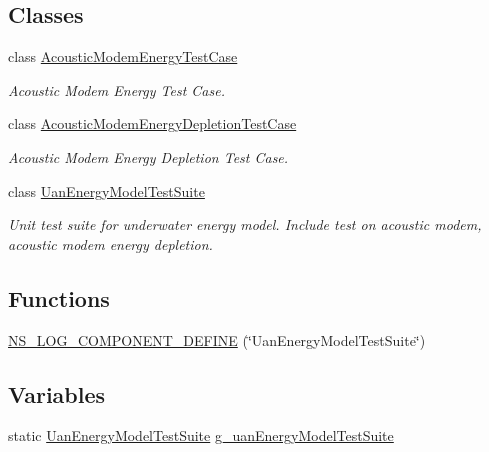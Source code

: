 \subsection*{Classes}
\begin{DoxyCompactItemize}
\item 
class \hyperlink{classAcousticModemEnergyTestCase}{Acoustic\+Modem\+Energy\+Test\+Case}
\begin{DoxyCompactList}\small\item\em Acoustic Modem Energy Test Case. \end{DoxyCompactList}\item 
class \hyperlink{classAcousticModemEnergyDepletionTestCase}{Acoustic\+Modem\+Energy\+Depletion\+Test\+Case}
\begin{DoxyCompactList}\small\item\em Acoustic Modem Energy Depletion Test Case. \end{DoxyCompactList}\item 
class \hyperlink{classUanEnergyModelTestSuite}{Uan\+Energy\+Model\+Test\+Suite}
\begin{DoxyCompactList}\small\item\em Unit test suite for underwater energy model. Include test on acoustic modem, acoustic modem energy depletion. \end{DoxyCompactList}\end{DoxyCompactItemize}
\subsection*{Functions}
\begin{DoxyCompactItemize}
\item 
\hyperlink{uan-energy-model-test_8cc_afe6a570fe57ecf9f8c51a0417893abfc}{N\+S\+\_\+\+L\+O\+G\+\_\+\+C\+O\+M\+P\+O\+N\+E\+N\+T\+\_\+\+D\+E\+F\+I\+NE} (\char`\"{}Uan\+Energy\+Model\+Test\+Suite\char`\"{})
\end{DoxyCompactItemize}
\subsection*{Variables}
\begin{DoxyCompactItemize}
\item 
static \hyperlink{classUanEnergyModelTestSuite}{Uan\+Energy\+Model\+Test\+Suite} \hyperlink{uan-energy-model-test_8cc_a549d8fd3dd0d1b2bbed17dcdbcbe4188}{g\+\_\+uan\+Energy\+Model\+Test\+Suite}
\end{DoxyCompactItemize}


